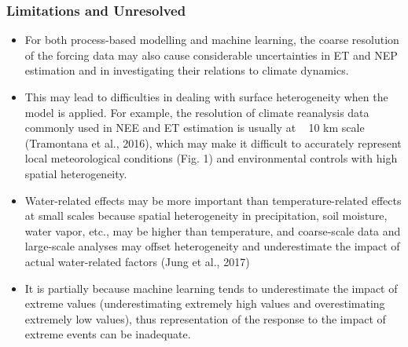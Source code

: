\documentclass[paper=a4, fontsize=12pt]{scrartcl}
\begin{document}
	\subsubsection*{Limitations and Unresolved}
	\begin{itemize}
		\item For both process-based modelling and machine learning, the coarse resolution of the forcing data may also cause considerable uncertainties in ET and NEP estimation and in investigating their relations to climate dynamics. 
		\item This may lead to difficulties in dealing with surface heterogeneity when the model is applied. For example, the resolution of climate reanalysis data commonly used in NEE and ET estimation is usually at ~ 10 km scale (Tramontana et al., 2016), which may make it difficult to accurately represent local meteorological conditions (Fig. 1) and environmental controls with high spatial heterogeneity.
		\item Water-related effects may be more important than temperature-related effects at small scales because spatial heterogeneity in precipitation, soil moisture, water vapor, etc., may be higher than temperature, and coarse-scale data and large-scale analyses may offset heterogeneity and underestimate the impact of actual water-related factors (Jung et al., 2017)
		\item It is partially because machine learning tends to underestimate the impact of extreme values (underestimating extremely high values and overestimating extremely low values), thus representation of the response to the impact of extreme events can be inadequate.
	\end{itemize}
	
	
\end{document}
